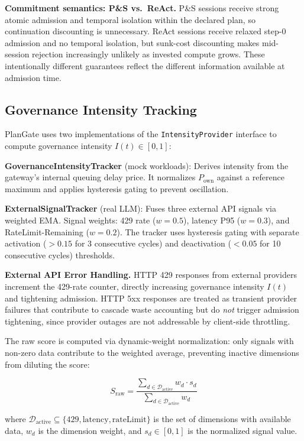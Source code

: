 \documentclass[sigconf,review,anonymous]{acmart}
\begin{document}
\textbf{Commitment semantics: P\&S vs.\ ReAct.}
P\&S sessions receive strong atomic admission and temporal isolation within the declared plan, so continuation discounting is unnecessary. ReAct sessions receive relaxed step-0 admission and no temporal isolation, but sunk-cost discounting makes mid-session rejection increasingly unlikely as invested compute grows. These intentionally different guarantees reflect the different information available at admission time.

\subsection{Governance Intensity Tracking}

PlanGate uses two implementations of the \texttt{IntensityProvider} interface to compute governance intensity $I(t) \in [0, 1]$:

\noindent\textbf{GovernanceIntensityTracker} (mock workloads): Derives intensity from the gateway's internal queuing delay price. It normalizes $P_{\text{own}}$ against a reference maximum and applies hysteresis gating to prevent oscillation.

\noindent\textbf{ExternalSignalTracker} (real LLM): Fuses three external API signals via weighted EMA. Signal weights: 429 rate ($w=0.5$), latency P95 ($w=0.3$), and RateLimit-Remaining ($w=0.2$). The tracker uses hysteresis gating with separate activation ($>0.15$ for 3 consecutive cycles) and deactivation ($<0.05$ for 10 consecutive cycles) thresholds.

\textbf{External API Error Handling.}
HTTP 429 responses from external providers increment the 429-rate counter, directly increasing governance intensity $I(t)$ and tightening admission. HTTP 5xx responses are treated as transient provider failures that contribute to cascade waste accounting but do \emph{not} trigger admission tightening, since provider outages are not addressable by client-side throttling.


The raw score is computed via dynamic-weight normalization: only signals with non-zero data contribute to the weighted average, preventing inactive dimensions from diluting the score:

\begin{equation}
S_{\text{raw}} = \frac{\sum_{d \in \mathcal{D}_{\text{active}}} w_d \cdot s_d}{\sum_{d \in \mathcal{D}_{\text{active}}} w_d}
\end{equation}

\noindent where $\mathcal{D}_{\text{active}} \subseteq \{429, \text{latency}, \text{rateLimit}\}$ is the set of dimensions with available data, $w_d$ is the dimension weight, and $s_d \in [0,1]$ is the normalized signal value.
\end{document}
